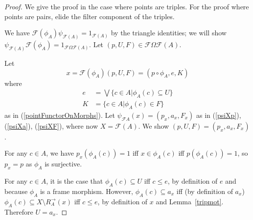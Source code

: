 \documentclass{article}[a4paper]
\theoremstyle{definition}
\newcommand{\Fcal}{\mathcal{F}} %
\newcommand{\dirim}{^{\rightarrow\!}}
\newcommand{\interiorop}[1]{{#1}^\circ}
\begin{document}
\begin{proof}
We give the proof in the case where points are triples. For the proof where points are pairs, elide the filter component of the triples.

We have 
$\mathcal{F}(\phi _A) \psi _{ \mathcal{F}(A)} = 1 _{\mathcal{F}(A)}$ 
by the triangle identities; we will show 
$\psi _{ \mathcal{F}(A) } \mathcal{F} (\phi _A) = 1 _{\mathcal{F}\Omega\mathcal{F}(A)}$.
Let $(p, U , F ) \in \mathcal{F} 
\Omega \mathcal{F} (A)$.

Let
\begin{equation*}
x = \mathcal{F}(\phi _A)(p, U, F ) 
 =  (p \circ \phi _A, e , K ) 
\end{equation*}
where 
\begin{align*}
    e &= \bigvee \{ c \in A | \phi _A (c) \subseteq U\} \\
    K &= \{ c \in A | \phi _A (c) \in F \} 
\end{align*}
as in (\ref{pointFunctorOnMorphs}).
Let $\psi _{\mathcal{F} A} (x) = (p_x , a_x , F_x)$ as in (\ref{psiXp}), (\ref{psiXa}), (\ref{psiXF}), where now $X = \Fcal(A)$.
We show $(p,U,F) = (p_x , a_x , F_x)$. %

For any $c \in A$, we have $p_x ( \phi _A (c))=1$ iff $x \in \phi _A(c)$ iff 
$p ( \phi _A (c))=1$, so $p_x = p$ as $\phi_A$ is surjective.

For any $c \in A$, it is the case that $\phi _A (c) \subseteq U$ iff 
$c \leq e$, by definition of $e$ and because $\phi_A$ is a frame morphism. 
However, 
$\phi _A(c) \subseteq a_x$ 
iff (by definition of $a_x$)
$\phi _A (c) \subseteq  X \setminus R_A\dirim (x)$ 
iff $c \leq e$, by definition of $x$ and Lemma~\ref{tripmot}.
Therefore $U = a_x$. 


\end{proof}
\end{document}
